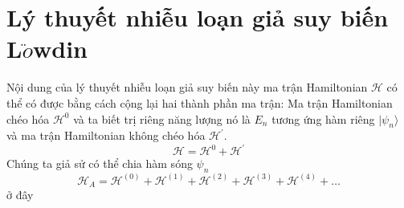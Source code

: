 \section{Lý thuyết nhiễu loạn giả suy biến L$\ddot{o}$wdin}
Nội dung của lý thuyết nhiễu loạn giả suy biến này ma trận Hamiltonian $\mathcal{H}$ có thể có được bằng cách cộng lại hai thành phần ma trận: Ma trận Hamiltonian chéo hóa $\mathcal{H}^0$ và ta biết trị riêng năng lượng nó là $E_n$ tương ứng hàm riêng $|\psi_n\rangle$ và ma trận Hamiltonian không chéo hóa $\mathcal{H}^{'}$.
\begin{equation}
\mathcal{H} = \mathcal{H}^0 +\mathcal{H}^{'}
\end{equation}
Chúng ta giả sử có thể chia hàm sóng $\psi_n$
\begin{equation}
\mathcal{H}_A = \mathcal{H}^{(0)}+ \mathcal{H}^{(1)}+ \mathcal{H}^{(2)}+ \mathcal{H}^{(3)} + \mathcal{H}^{(4)} +\dots
\end{equation}
ở đây
